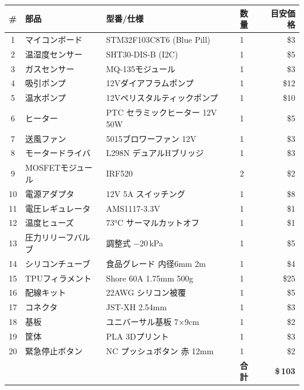 \documentclass[a4paper,11pt]{article}
\begin{document}
\begin{longtable}{@{}clllr@{}}
\toprule
\textbf{\#} & \textbf{部品} & \textbf{型番/仕様} & \textbf{数量} & \textbf{目安価格} \\
\midrule
\endhead
1  & マイコンボード     & STM32F103C8T6 (Blue Pill)  & 1 & \$3  \\
2  & 温湿度センサー     & SHT30-DIS-B (I2C)         & 1 & \$5  \\
3  & ガスセンサー       & MQ-135モジュール            & 1 & \$3  \\
4  & 吸引ポンプ         & 12Vダイアフラムポンプ       & 1 & \$12 \\
5  & 温水ポンプ         & 12Vペリスタルティックポンプ  & 1 & \$10 \\
6  & ヒーター           & PTC セラミックヒーター 12V 50W & 1 & \$5  \\
7  & 送風ファン         & 5015ブロワーファン 12V       & 1 & \$3  \\
8  & モータードライバ   & L298N デュアルHブリッジ      & 1 & \$3  \\
9  & MOSFETモジュール   & IRF520                     & 2 & \$2  \\
10 & 電源アダプタ       & 12V 5A スイッチング         & 1 & \$8  \\
11 & 電圧レギュレータ   & AMS1117-3.3V               & 1 & \$1  \\
12 & 温度ヒューズ       & 73°C サーマルカットオフ      & 1 & \$1  \\
13 & 圧力リリーフバルブ & 調整式 $-20$\,kPa           & 1 & \$5  \\
14 & シリコンチューブ   & 食品グレード 内径6mm 2m      & 1 & \$4  \\
15 & TPUフィラメント     & Shore 60A 1.75mm 500g      & 1 & \$25 \\
16 & 配線キット         & 22AWG シリコン被覆          & 1 & \$5  \\
17 & コネクタ           & JST-XH 2.54mm              & 1 & \$3  \\
18 & 基板               & ユニバーサル基板 7$\times$9cm & 1 & \$2  \\
19 & 筐体               & PLA 3Dプリント              & 1 & \$3  \\
20 & 緊急停止ボタン     & NC プッシュボタン 赤 12mm   & 1 & \$2  \\
\midrule
   & & & \textbf{合計} & \textbf{\$\,\raisebox{0pt}{\~{}}103} \\
\bottomrule
\end{longtable}
\end{document}
